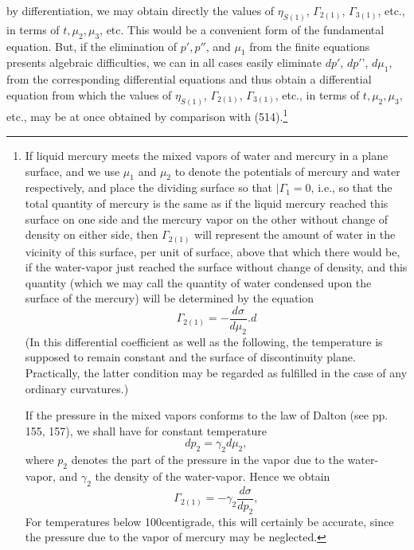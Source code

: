 \documentclass[12pt]{memoir}
\begin{document}
{by differentiation, we may obtain directly the values of $\eta_{S(1)}$, $\Gamma_{2(1)}$, $\Gamma_{3(1)}$, etc., in terms of $t, \mu_2,\mu_3$, etc. This would be a convenient form of the fundamental equation. But, if the elimination of $p', p''$, and $\mu_1$ from the finite equations presents algebraic difficulties, we can in all cases easily eliminate $dp'$, $dp'$', $d\mu_1$, from the corresponding differential equations and thus obtain a differential equation        from which the values of $\eta_{S(1)}$, $\Gamma_{2(1)}$, $\Gamma_{3(1)}$, etc., in terms of $t, \mu_2,\mu_3$, etc., may be at once obtained by comparison with (514).\footnote{If liquid mercury meets the mixed vapors of water and mercury in a plane surface, and we use $\mu_1$ and $\mu_2$ to denote the potentials of mercury and water respectively, and place the dividing surface so that $|\Gamma_1=0$, i.e., so that the total quantity of mercury is the same as if the liquid mercury reached this surface on one side and the mercury vapor on the other without change of density on either side, then $\Gamma_{2(1)}$ will represent the amount of water in the vicinity of this surface, per unit of surface, above that which there would be, if the water-vapor just reached the surface without change of density, and this quantity (which we may call the quantity of water condensed upon the surface of the mercury) will be determined by the equation
$$ \Gamma_{2(1)} = -\frac{d\sigma}{d\mu_2}.                d$$
(In this differential coefficient as well as the following, the temperature is supposed to remain constant and the surface of discontinuity plane. Practically, the latter condition may be regarded as fulfilled in the case of any ordinary curvatures.)\par
If the pressure in the mixed vapors conforms to the law of Dalton (see pp. 155, 157), we shall have for constant temperature
$$ dp_2= \gamma_2 d\mu_2,$$
where $p_2$ denotes the part of the pressure in the vapor due to the water-vapor, and $\gamma_2 $ the density of the water-vapor. Hence we obtain
$$ \Gamma_{2(1)} = - \gamma_2 \frac{d\sigma}{dp_2},$$
For temperatures below 100\degree  centigrade, this will certainly be accurate, since the pressure due to the vapor of mercury may be neglected.\par
}}
\end{document}
